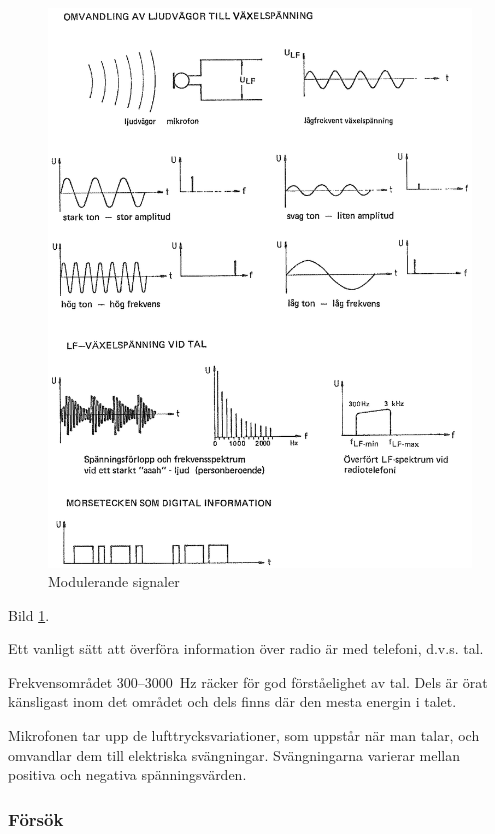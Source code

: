 \begin{figure}
\includegraphics[width=\textwidth]{images/cropped_pdfs/bild_2_1-23.pdf}
\caption{Modulerande signaler}
\label{fig:BildII1-23}
\end{figure}

Bild \ref{fig:BildII1-23}.

Ett vanligt sätt att överföra information över radio är med telefoni, d.v.s.
tal.

Frekvensområdet 300--3000~Hz räcker för god förståelighet av tal. Dels är örat
känsligast inom det området och dels finns där den mesta energin i talet.

Mikrofonen tar upp de lufttrycksvariationer, som uppstår när man talar, och
omvandlar dem till elektriska svängningar. Svängningarna varierar mellan
positiva och negativa spänningsvärden.

\subsubsection{Försök}

